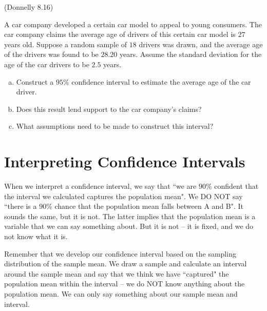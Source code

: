 \documentclass[12pt, letterpaper]{article}
\newcounter{exercise}
\theoremstyle{definition}
\begin{document}
\newpage

\begin{exercise}  (Donnelly 8.16)

A car company developed a certain car model to appeal to young consumers.  The car company claims the average age of drivers of this certain car model is $27$ years old.  Suppose a random sample of $18$ drivers was drawn, and the average age of the drivers was found to be $28.20$ years.  Assume the standard deviation for the age of the car drivers to be $2.5$ years.

\end{exercise}

\begin{enumerate}[(a)]

\item Construct a $95\%$ confidence interval to estimate the average age of the car driver.

\vfill
\vfill

\item Does this result lend support to the car company's claims?

\vfill

\item What assumptions need to be made to construct this interval?

\vfill

\end{enumerate}

\newpage
\vspace*{-.7in}

\section*{Interpreting Confidence Intervals}

\noindent  When we interpret a confidence interval, we say that ``we are $90\%$ confident that the interval we calculated captures the population mean".  We DO NOT say ``there is a $90\%$ chance that the population mean falls between A and B".  It sounds the same, but it is not.  The latter implies that the population mean is a variable that we can say something about.  But it is not -- it is fixed, and we do not know what it is.

\vspace*{.1in}

\noindent Remember that we develop our confidence interval based on the sampling distribution of the sample mean.  We draw a sample and calculate an interval around the sample mean and say that we think we have ``captured" the population mean within the interval -- we do NOT know anything about the population mean.  We can only say something about our sample mean and interval.
\end{document}
